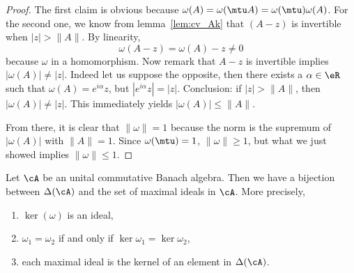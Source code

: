 \begin{proof}
	The first claim is obvious because $\omega(A)=\omega(\mtu A)=\omega(\mtu)\omega(A)$.  For the second one, we know from lemma~\ref{lem:cv_Ak} that $(A-z)$ is invertible when $|z|>\|A\|$. By
	linearity,
	\[
		\omega(A-z)=\omega(A)-z\neq 0
	\]
	because $\omega$ in a homomorphism. Now remark that $A-z$ is invertible implies $|\omega(A)|\neq |z|$. Indeed let us suppose the opposite, then there exists a $\alpha\in\eR$ such that $\omega(A)=e^{i\alpha}z$, but $|e^{i\alpha}z|=|z|$. Conclusion: if $|z|>\|A\|$, then $|\omega(A)|\neq|z|$. This immediately yields $|\omega(A)|\leq\|A\|$.

	From there, it is clear that $\|\omega\|=1$ because the norm is the supremum of $|\omega(A)|$ with $\|A\|=1$. Since $\omega(\mtu)=1$, $\|\omega\|\geq 1$, but what we just showed implies $\|\omega\|\leq 1$.

\end{proof}

\begin{theorem}
	Let $\cA$ be an unital commutative Banach algebra. Then we have a bijection between $\Delta(\cA)$ and the set of maximal ideals in $\cA$. More precisely,

	\begin{enumerate}
		\item $\ker(\omega)$ is an ideal,                   \label{enuei}
		\item $\omega_1=\omega_2$ if and only if $\ker\omega_1=\ker\omega_2$,   \label{enueii}
		\item each maximal ideal is the kernel of an element in $\Delta(\cA)$.  \label{enueiii}
	\end{enumerate}\label{tho:ideal_kernel}
\end{theorem}


